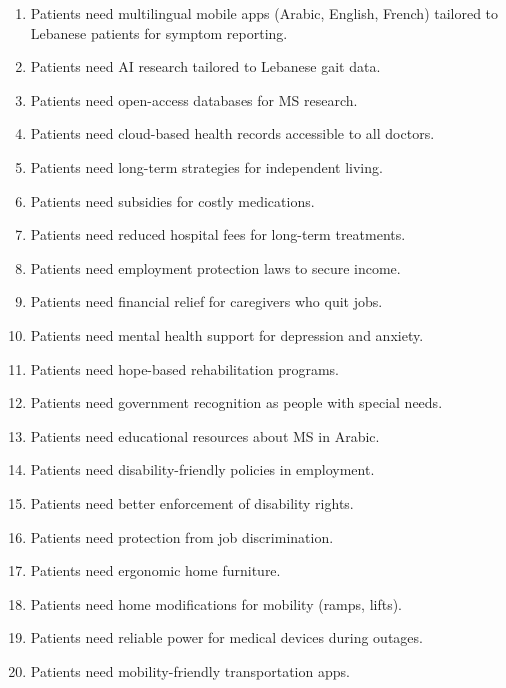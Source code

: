\begin{enumerate}
    \item Patients need multilingual mobile apps (Arabic, English, French) tailored to Lebanese patients for symptom reporting.
    \item Patients need AI research tailored to Lebanese gait data.
    \item Patients need open-access databases for MS research.
    \item Patients need cloud-based health records accessible to all doctors.
    \item Patients need long-term strategies for independent living.
    \item Patients need subsidies for costly medications.
    \item Patients need reduced hospital fees for long-term treatments.
    \item Patients need employment protection laws to secure income.
    \item Patients need financial relief for caregivers who quit jobs.
    \item Patients need mental health support for depression and anxiety.
    \item Patients need hope-based rehabilitation programs.
    \item Patients need government recognition as people with special needs.
    \item Patients need educational resources about MS in Arabic.
    \item Patients need disability-friendly policies in employment.
    \item Patients need better enforcement of disability rights.
    \item Patients need protection from job discrimination.
    \item Patients need ergonomic home furniture.
    \item Patients need home modifications for mobility (ramps, lifts).
    \item Patients need reliable power for medical devices during outages.
    \item Patients need mobility-friendly transportation apps.
\end{enumerate}



